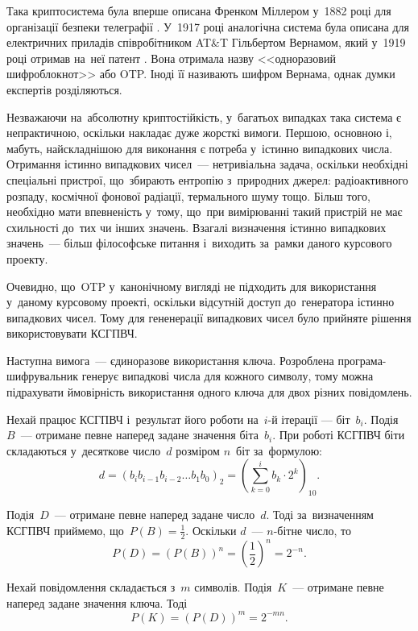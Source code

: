 \documentclass[a4paper,oneside,titlepage,14pt]{extarticle}
\begin{document}
				Така криптосистема була вперше описана Френком Міллером у~1882 році для організації безпеки телеграфії \cite{otpinventor}. У~1917 році аналогічна система була описана для електричних приладів співробітником AT\&T Гільбертом Вернамом, який у~1919 році отримав на~неї патент \cite{vernam1919secret}. Вона отримала назву <<одноразовий шифроблокнот>> або OTP. Іноді її називають шифром Вернама, однак думки експертів розділяються.\par
				Незважаючи на~абсолютну криптостійкість, у~багатьох випадках така система є непрактичною, оскільки накладає дуже жорсткі вимоги. Першою, основною і, мабуть, найскладнішою для виконання є потреба у~істинно випадкових числа. Отримання істинно випадкових чисел~--- нетривіальна задача, оскільки необхідні спеціальні пристрої, що~збирають ентропію з~природних джерел: радіоактивного розпаду, космічної фонової радіації, термального шуму тощо. Більш того, необхідно мати впевненість у~тому, що~при вимірюванні такий пристрій не має схильності до~тих чи інших значень. Взагалі визначення істинно випадкових значень~--- більш філософське питання і~виходить за~рамки даного курсового проекту.\par
				Очевидно, що~OTP у~канонічному вигляді не підходить для використання у~даному курсовому проекті, оскільки відсутній доступ до~генератора істинно випадкових чисел. Тому для гененерації випадкових чисел було прийняте рішення використовувати КСГПВЧ.\par
				Наступна вимога~--- єдиноразове використання ключа. Розроблена програма-шифрувальник генерує випадкові числа для кожного символу, тому можна підрахувати ймовірність використання одного ключа для двох різних повідомлень.\par
				Нехай працює КСГПВЧ і~результат його роботи на~$i$-й ітерації --- біт~$b_i$. Подія~$B$~--- отримане певне наперед задане значення біта~$b_i$. При роботі КСГПВЧ біти складаються у~десяткове число~$d$ розміром $n$~біт за~формулою:
				\[
					d = \left( b_{i}b_{i-1}b_{i-2}\dots b_1b_0 \right)_2 = \left( \sum_{k=0}^{i} b_k \cdot 2^k \right)_{10}.
				\] \par
				Подія~$D$~--- отримане певне наперед задане число~$d$. Тоді за~визначенням КСГПВЧ приймемо, що~$P(B) = \frac{1}{2}$. Оскільки $d$~--- $n$-бітне число, то 
				\[
				P(D) = \left(P(B)\right)^n = \left({\frac{1}{2}}\right)^n = 2^{-n}.
				\] \par
				Нехай повідомлення складається з~$m$ символів. Подія~$K$~--- отримане певне наперед задане значення ключа. Тоді
				\[
				P(K) = \left(P(D)\right)^{m} = 2^{-mn}.
				\] \par
\end{document}
